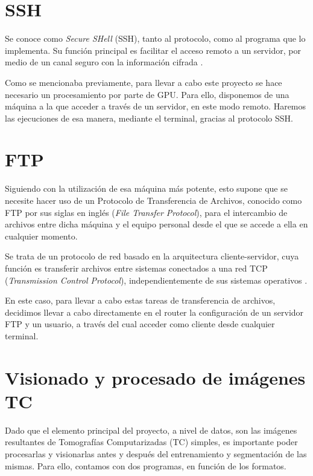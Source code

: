\section{SSH}

Se conoce como \textit{Secure SHell} (SSH), tanto al protocolo, como al programa que lo implementa. Su función principal es facilitar el acceso remoto a un servidor, por medio de un canal seguro con la información cifrada \cite{wiki:ssh}.

Como se mencionaba previamente, para llevar a cabo este proyecto se hace necesario un procesamiento por parte de GPU. Para ello, disponemos de una máquina a la que acceder a través de un servidor, en este modo remoto. Haremos las ejecuciones de esa manera, mediante el terminal, gracias al protocolo SSH.


\section{FTP}

Siguiendo con la utilización de esa máquina más potente, esto supone que se necesite hacer uso de un Protocolo de Transferencia de Archivos, conocido como FTP por sus siglas en inglés (\textit{File Transfer Protocol}), para el intercambio de archivos entre dicha máquina y el equipo personal desde el que se accede a ella en cualquier momento.

Se trata de un protocolo de red basado en la arquitectura cliente-servidor, cuya función es transferir archivos entre sistemas conectados a una red TCP (\textit{Transmission Control Protocol}), independientemente de sus sistemas operativos \cite{wiki:ftp}.

En este caso, para llevar a cabo estas tareas de transferencia de archivos, decidimos llevar a cabo directamente en el router la configuración de un servidor FTP y un usuario, a través del cual acceder como cliente desde cualquier terminal.


\section{Visionado y procesado de imágenes TC}

Dado que el elemento principal del proyecto, a nivel de datos, son las imágenes resultantes de Tomografías Computarizadas (TC) simples, es importante poder procesarlas y visionarlas antes y después del entrenamiento y segmentación de las mismas. Para ello, contamos con dos programas, en función de los formatos.

